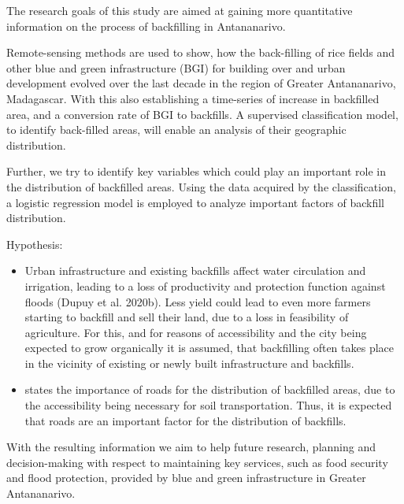 \documentclass[11pt, A4, oneside]{report}
\begin{document}
The research goals of this study are aimed at gaining more quantitative information on the process of backfilling in Antananarivo.

Remote-sensing methods are used to show, how the back-filling of rice fields and other blue and green infrastructure (BGI) for building over and urban development evolved over the last decade in the region of Greater Antananarivo, Madagascar. With this also establishing a time-series of increase in backfilled area, and a conversion rate of BGI to backfills. A supervised classification model, to identify back-filled areas, will enable an analysis of their geographic distribution. 

Further, we try to identify key variables which could play an important role in the distribution of backfilled areas. Using the data acquired by the classification, a logistic regression model is employed to analyze important factors of backfill distribution.


Hypothesis:
\begin{itemize}
\item Urban infrastructure and existing backfills affect water circulation and irrigation, leading to a loss of productivity and protection function against floods (Dupuy et al. 2020b). Less yield could lead to even more farmers starting to backfill and sell their land, due to a loss in feasibility of agriculture. For this, and for reasons of accessibility and the city being expected to grow organically it is assumed, that backfilling often takes place in the vicinity of existing or newly built infrastructure and backfills.

\item \citet{Aubry.2012} states the importance of roads for the distribution of backfilled areas, due to the accessibility being necessary for soil transportation. Thus, it is expected that roads are an important factor for the distribution of backfills.
\end{itemize}

With the resulting information we aim to help future research, planning and decision-making with respect to maintaining key services, such as food security and flood protection, provided by blue and green infrastructure in Greater Antananarivo.
\end{document}

